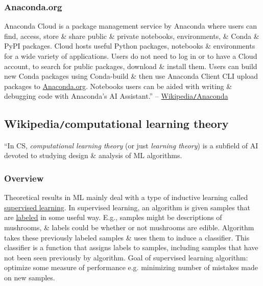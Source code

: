 \documentclass{article}
\begin{document}
\subsubsection{Anaconda.org}
Anaconda Cloud is a package management service by Anaconda where users can find, access, store \& share public \& private notebooks, environments, \& Conda \& PyPI packages. Cloud hosts useful Python packages, notebooks \& environments for a wide variety of applications. Users do not need to log in or to have a Cloud account, to search for public packages, download \& install them. Users can build new Conda packages using Conda-build \& then use Anaconda Client CLI upload packages to \url{Anaconda.org}. Notebooks users can be aided with writing \& debugging code with Anaconda's AI Assistant.'' -- \href{https://en.wikipedia.org/wiki/Anaconda_(Python_distribution)}{Wikipedia{\tt/}Anaconda}


\subsection{Wikipedia{\tt/}computational learning theory}
``In CS, {\it computational learning theory} (or just {\it learning theory}) is a subfield of AI devoted to studying design \& analysis of ML algorithms.

\subsubsection{Overview}
Theoretical results in ML mainly deal with a type of inductive learning called \href{https://en.wikipedia.org/wiki/Supervised_learning}{supervised learning}. In supervised learning, an algorithm is given samples that are \href{https://en.wikipedia.org/wiki/Labeled_data}{labeled} in some useful way. E.g., samples might be descriptions of mushrooms, \& labels could be whether or not mushrooms are edible. Algorithm takes these previously labeled samples \& uses them to induce a classifier. This classifier is a function that assigns labels to samples, including samples that have not been seen previously by algorithm. Goal of supervised learning algorithm: optimize some measure of performance e.g. minimizing number of mistakes made on new samples.
\end{document}
